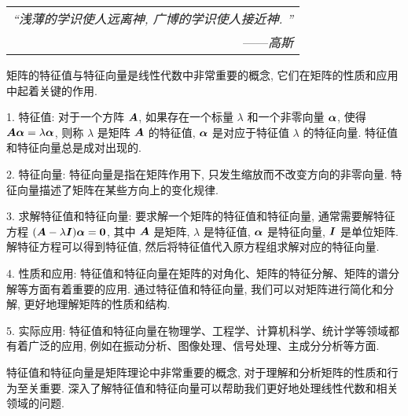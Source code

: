 \begin{flushright}
    \begin{tabular}{r||}
        \textit{“浅薄的学识使人远离神, 广博的学识使人接近神. ”}\\
        ——\textit{高斯}
    \end{tabular}
\end{flushright}

矩阵的特征值与特征向量是线性代数中非常重要的概念, 它们在矩阵的性质和应用中起着关键的作用. 

1. 特征值: 对于一个方阵 $\vb*{A}$, 如果存在一个标量 $\lambda$ 和一个非零向量 $\vb*{\alpha}$, 使得 $\vb*{A\alpha} = \lambda\vb*{\alpha}$, 则称 $\lambda$ 是矩阵 $\vb*{A}$ 的特征值, $\vb*{\alpha}$ 是对应于特征值 $\lambda$ 的特征向量. 特征值和特征向量总是成对出现的. 

2. 特征向量: 特征向量是指在矩阵作用下, 只发生缩放而不改变方向的非零向量. 特征向量描述了矩阵在某些方向上的变化规律. 

3. 求解特征值和特征向量: 要求解一个矩阵的特征值和特征向量, 通常需要解特征方程 $(\vb*{A} - \lambda \vb*{I})\vb*{\alpha} = \mathbf{0}$, 其中 $\vb*{A}$ 是矩阵, $\lambda$ 是特征值, $\vb*{\alpha}$ 是特征向量, $\vb*{I}$ 是单位矩阵. 解特征方程可以得到特征值, 然后将特征值代入原方程组求解对应的特征向量. 

4. 性质和应用: 特征值和特征向量在矩阵的对角化、矩阵的特征分解、矩阵的谱分解等方面有着重要的应用. 通过特征值和特征向量, 我们可以对矩阵进行简化和分解, 更好地理解矩阵的性质和结构. 

5. 实际应用: 特征值和特征向量在物理学、工程学、计算机科学、统计学等领域都有着广泛的应用, 例如在振动分析、图像处理、信号处理、主成分分析等方面. 

特征值和特征向量是矩阵理论中非常重要的概念, 对于理解和分析矩阵的性质和行为至关重要. 深入了解特征值和特征向量可以帮助我们更好地处理线性代数和相关领域的问题. 